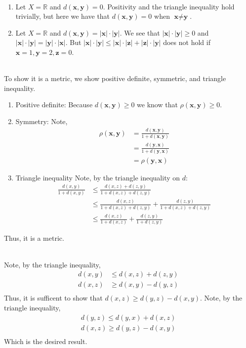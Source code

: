 \documentclass[letterpaper,12pt]{article}
\theoremstyle{definition}
\begin{document}
\\
\begin{enumerate}
    \item 
Let $X = \mathbb{R}$ and $d(\textbf{x}, \textbf{y}) = 0$. Positivity and the triangle inequality hold trivially, but here we have that $d(\textbf{x}, \textbf{y}) = 0$ when $\textbf{x} \neq \textbf{y}$.  \\
    \item
Let $X = \mathbb{R}$ and $d(\textbf{x} ,\textbf{y}) = |\textbf{x}| \cdot |\textbf{y}|$. We see that $|\textbf{x}| \cdot |\textbf{y}| \geq 0$ and $|\textbf{x}| \cdot |\textbf{y}| = |\textbf{y}| \cdot |\textbf{x}|$. But $|\textbf{x}| \cdot |\textbf{y}| \leq |\textbf{x}| \cdot |\textbf{z}| + |\textbf{z}| \cdot |\textbf{y}|$ does not hold if $\textbf{x} = 1, \textbf{y} = 2, \textbf{z} = 0$. 
\end{enumerate}

\\
To show it is a metric, we show positive definite, symmetric, and triangle inequality. 
\begin{enumerate}
    \item Positive definite:
Because $d(\textbf{x}, \textbf{y}) \geq 0$ we know that $\rho (\textbf{x}, \textbf{y}) \geq 0$.\\
    \item Symmetry: Note,
\begin{align*}
    \rho (\textbf{x}, \textbf{y}) &= \frac{d(\textbf{x}, \textbf{y})}{1 + d(\textbf{x}, \textbf{y})} \\
    &= \frac{d(\textbf{y}, \textbf{x})}{1 + d(\textbf{y}, \textbf{x})} \\
    &=  \rho (\textbf{y}, \textbf{x})
\end{align*}

    \item Triangle inequality
Note, by the triangle inequality on $d$:
\begin{align*}
    \frac{d(x,y)}{1+d(x,y)}&\leq \frac{d(x,z)+d(z,y)}{1+d(x,z)+d(z,y)} \\
    & \leq \frac{d(x,z)}{1+d(x,z)+d(z,y)} + \frac{d(z,y)}{1+d(x,z)+d(z,y)} \\
    &  \leq \frac{d(x,z)}{1+d(x,z)} + \frac{d(z,y)}{1+d(z,y)}
\end{align*}
\end{enumerate}
Thus, it is a metric.

\\
Note, by the triangle inequality,
\begin{align*}
    d(x,y) & \leq d(x,z)+d(z,y) \\
    d(x,z)& \geq d(x,y)-d(y,z)\\
\end{align*}
Thus, it is sufficent to show that $d(x,z) \geq d(y,z) - d(x,y)$. Note, by the triangle inequality, 
\begin{align*}
    d(y,z) \leq d(y,x) + d(x,z) \\
    d(x,z) \geq d(y,z) - d(x,y) \\
\end{align*}
Which is the desired result.
\end{document}
